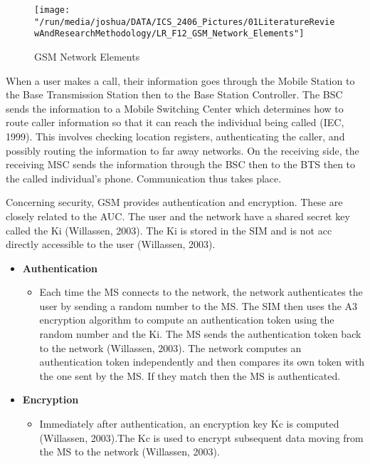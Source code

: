 \documentclass[12pt,svgnames,smaller]{article} %
\begin{document}
	\begin{figure}
		\centering
		\texttt{[image: "/run/media/joshua/DATA/ICS\_2406\_Pictures/01LiteratureReviewAndResearchMethodology/LR\_F12\_GSM\_Network\_Elements"]}
		\caption{GSM Network Elements}				\label{fig:LiteratureReview-Figure12}
	\end{figure}
			
	When a user makes a call, their information goes through the Mobile Station to the Base Transmission Station then to the Base Station Controller. The BSC sends the information to a Mobile Switching Center which determines how to route caller information so that it can reach the individual being called (IEC, 1999). This involves checking location registers, authenticating the caller, and possibly routing the information to far away networks. On the receiving side, the receiving MSC sends the information through the BSC then to the BTS then to the called individual’s phone. Communication thus takes place.
	
	Concerning security, GSM provides authentication and encryption. These are closely related to the AUC. The user and the network have a shared secret key called the Ki (Willassen, 2003). The Ki is stored in the SIM and is not acc directly accessible to the user (Willassen, 2003).
	
	\begin{itemize}
		
		\item \textbf{Authentication} 
		
			\begin{itemize}
				\item Each time the MS connects to the network, the network authenticates the user by sending a random number to the MS. The SIM then uses the A3 encryption algorithm to compute an authentication token using the random number and the Ki. The MS sends the authentication token back to the network (Willassen, 2003). The network computes an authentication token independently and then compares its own token with the one sent by the MS. If they match then the MS is authenticated. 
			\end{itemize}
			
		
		\item \textbf{Encryption}
		
		\begin{itemize}
			\item Immediately after authentication, an encryption key Kc is computed (Willassen, 2003).The Kc is used to encrypt subsequent data moving from the MS to the network (Willassen, 2003).
		\end{itemize}
		
		
	\end{itemize}
\end{document}
